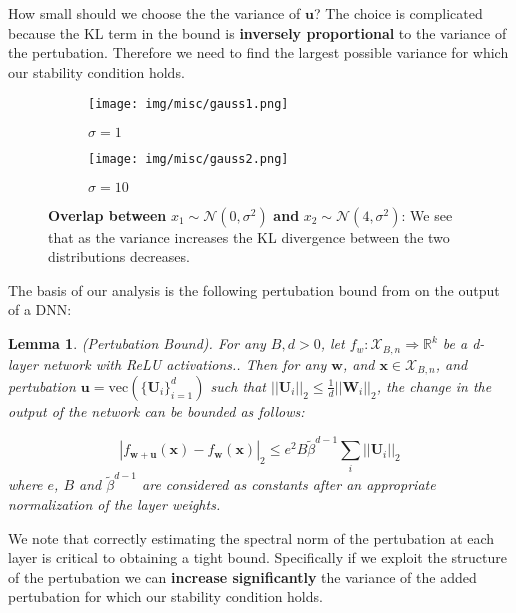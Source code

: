 \documentclass{article} %
\newtheorem{lemma}[theorem]{Lemma}
\theoremstyle{definition}
\begin{document}
How small should we choose the the variance of $\boldsymbol{u}$? The choice is complicated because the KL term in the bound is \textbf{inversely proportional} to the variance of the pertubation. Therefore we need to find the largest possible variance for which our stability condition holds.

\begin{figure}[h!]
\centering
\begin{subfigure}{.5\textwidth}
  \centering
  \texttt{[image: img/misc/gauss1.png]}
  \caption{$\sigma = 1$ }
  \label{fig:sub1}
\end{subfigure}%
\begin{subfigure}{.5\textwidth}
  \centering
  \texttt{[image: img/misc/gauss2.png]}
  \caption{$\sigma = 10$}
  \label{fig:sub2}
\end{subfigure}
\caption{\textbf{Overlap between} $x_1 \sim \mathcal{N}(0,\sigma^2)$ \textbf{and} $x_2 \sim \mathcal{N}(4,\sigma^2)$: We see that as the variance increases the KL divergence between the two distributions decreases.}
\label{fig:test}
\end{figure}

The basis of our analysis is the following pertubation bound from \citet{neyshabur2017pac} on the output of a DNN:

\begin{lemma}
(Pertubation Bound). For any $B,d > 0$, let $f_w:\mathcal{X}_{B,n} \Rightarrow \mathbb{R}^k$ be a d-layer network with ReLU activations.. Then for any $\boldsymbol{w}$, and $\boldsymbol{x} \in \mathcal{X}_{B,n}$, and pertubation $\boldsymbol{u} = \text{vec}(\{\boldsymbol{U}_i \}^d_{i=1} )$ such that $||\boldsymbol{U}_i ||_2 \leq \frac{1}{d}||\boldsymbol{W}_i ||_2$, the change in the output of the network can be bounded as follows:

\begin{equation}
	|f_{\boldsymbol{w}+\boldsymbol{u} }(\boldsymbol{x})-f_{\boldsymbol{w}}(\boldsymbol{x})|_2 \leq e^2B \tilde{\beta}^{d-1} \sum_i ||\boldsymbol{U}_i||_2
\end{equation}
where $e$, $B$ and $\tilde{\beta}^{d-1}$ are considered as constants after an appropriate normalization of the layer weights. 
\end{lemma}

We note that correctly estimating the spectral norm of the pertubation at each layer is critical to obtaining a tight bound. Specifically if we exploit the structure of the pertubation we can \textbf{increase significantly} the variance of the added pertubation for which our stability condition holds.
\end{document}
